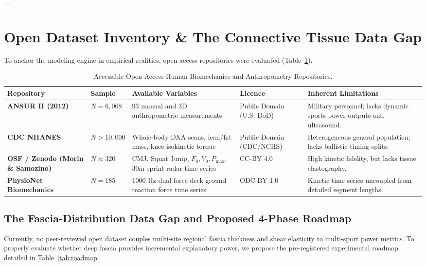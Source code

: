 \documentclass[11pt,a4paper]{article}
\begin{document}
---

\section{Open Dataset Inventory \& The Connective Tissue Data Gap}

To anchor the modeling engine in empirical realities, open-access repositories were evaluated (Table~\ref{tab:datasets}).

\begin{table}[htbp]
\centering
\small
\caption{Accessible Open-Access Human Biomechanics and Anthropometry Repositories.}
\label{tab:datasets}
\begin{tabularx}{\textwidth}{p{3.2cm}p{1.8cm}p{4.2cm}p{2.2cm}p{3.8cm}}
\toprule
\textbf{Repository} & \textbf{Sample} & \textbf{Available Variables} & \textbf{Licence} & \textbf{Inherent Limitations} \\
\midrule
\textbf{ANSUR II (2012)} & $N = 6,068$ & 93 manual and 3D anthropometric measurements & Public Domain (U.S. DoD) & Military personnel; lacks dynamic sports power outputs and ultrasound. \\
\addlinespace
\textbf{CDC NHANES} & $N > 10,000$ & Whole-body DXA scans, lean/fat mass, knee isokinetic torque & Public Domain (CDC/NCHS) & Heterogeneous general population; lacks ballistic timing splits. \\
\addlinespace
\textbf{OSF / Zenodo (Morin \& Samozino)} & $N \approx 320$ & CMJ, Squat Jump, $F_0, V_0, P_{\text{max}}$, 30m sprint radar time series & CC-BY 4.0 & High kinetic fidelity, but lacks tissue elastography. \\
\addlinespace
\textbf{PhysioNet Biomechanics} & $N = 185$ & 1000 Hz dual force deck ground reaction force time series & ODC-BY 1.0 & Kinetic time series uncoupled from detailed segment lengths. \\
\bottomrule
\end{tabularx}
\end{table}

\subsection{The Fascia-Distribution Data Gap and Proposed 4-Phase Roadmap}
Currently, no peer-reviewed open dataset couples multi-site regional fascia thickness and shear elasticity to multi-sport power metrics. To properly evaluate whether deep fascia provides incremental explanatory power, we propose the pre-registered experimental roadmap detailed in Table~\ref{tab:roadmap}.
\end{document}
